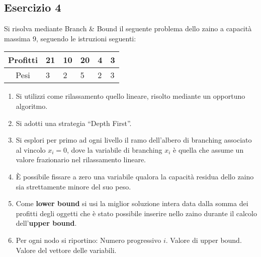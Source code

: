 \documentclass[\main/main.tex]{subfiles}
\begin{document}
\subsection{Esercizio 4}
Si risolva mediante Branch \& Bound il seguente problema dello zaino a capacità massima 9, seguendo le istruzioni seguenti:

\begin{table}
  \begin{tabular}{c|LLLLL}
    Profitti & 21 & 10 & 20 & 4 & 3 \\
    \hline
    Pesi     & 3  & 2  & 5  & 2 & 3
  \end{tabular}
\end{table}

\begin{enumerate}
  \item Si utilizzi come rilassamento quello lineare, risolto mediante un opportuno algoritmo.
  \item Si adotti una strategia ``Depth First''.
  \item Si esplori per primo ad ogni livello il ramo dell'albero di branching associato al vincolo $x_i=0$, dove la variabile di branching $x_i$ è quella che assume un valore frazionario nel rilassamento lineare.
  \item È possibile fissare a zero una variabile qualora la capacità residua dello zaino sia strettamente minore del suo peso.
  \item Come \textbf{lower bound} si usi la miglior soluzione intera data dalla somma dei profitti degli oggetti che è stato possibile inserire nello zaino durante il calcolo dell'\textbf{upper bound}.
  \item Per ogni nodo si riportino:
        \subitem Numero progressivo $i$.
        \subitem Valore di upper bound.
        \subitem Valore del vettore delle variabili.
\end{enumerate}
\end{document}
